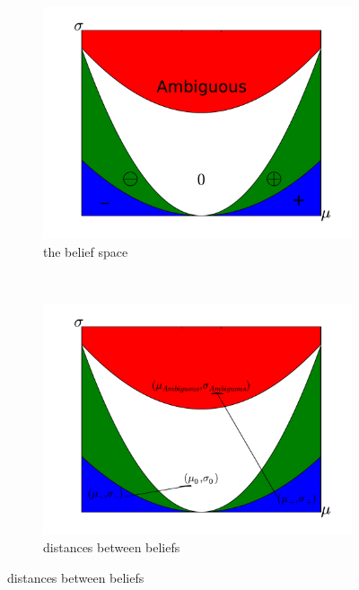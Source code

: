 \documentclass[12pt]{article}
\begin{document}
\begin{figure}
        \centering
        \begin{subfigure}[b]{0.5\textwidth}
                \centering
                \includegraphics[width=\textwidth]{priors.pdf}
                \caption{the belief space}
                \label{fig:space}
        \end{subfigure}%
        ~ %
        \begin{subfigure}[b]{0.5\textwidth}
                \centering
                \includegraphics[width=\textwidth]{distances.pdf}
                \caption{distances between beliefs}

\end{subfigure}
\end{figure}
\end{document}
